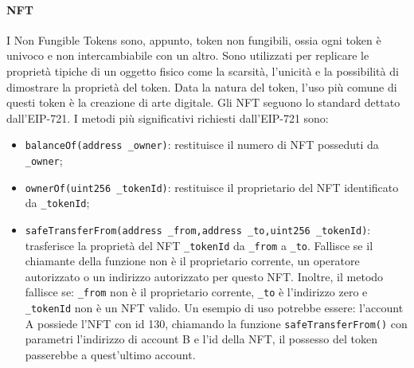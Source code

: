 \documentclass[a4paper]{article}
\begin{document}
    \paragraph{NFT}
    I Non Fungible Tokens sono, appunto, token non fungibili, ossia ogni token è univoco e non intercambiabile con un altro. Sono utilizzati per replicare le proprietà tipiche
    di un oggetto fisico come la scarsità, l'unicità e la possibilità di dimostrare la proprietà del token\cite{nft}.
    Data la natura del token, l'uso più comune di questi token è la creazione di arte digitale\cite{nftuse}.
    \newline
    Gli NFT seguono lo standard dettato dall'EIP-721. I metodi più significativi richiesti dall'EIP-721 sono:
    \begin{itemize}
      \item \verb|balanceOf(address _owner)|: restituisce il numero di NFT posseduti da \verb|_owner|;
      \item \verb|ownerOf(uint256 _tokenId)|: restituisce il proprietario del NFT identificato da \verb|_tokenId|;
      \item \verb|safeTransferFrom(address _from,address _to,uint256 _tokenId)|: trasferisce la proprietà del NFT \verb|_tokenId| da \verb|_from| a \verb|_to|.
            Fallisce se il chiamante della funzione non è il proprietario corrente, un operatore autorizzato o un indirizzo autorizzato per questo NFT.
            Inoltre, il metodo fallisce se: \verb|_from| non è il proprietario corrente, \verb|_to| è l'indirizzo zero e \verb|_tokenId| non è un NFT valido\cite{eip1155}.
            Un esempio di uso potrebbe essere: l'account A possiede l'NFT con id 130, chiamando la funzione \verb|safeTransferFrom()| con parametri l'indirizzo di account B e l'id della NFT, il possesso del token passerebbe a quest'ultimo account.
    \end{itemize}
\end{document}
